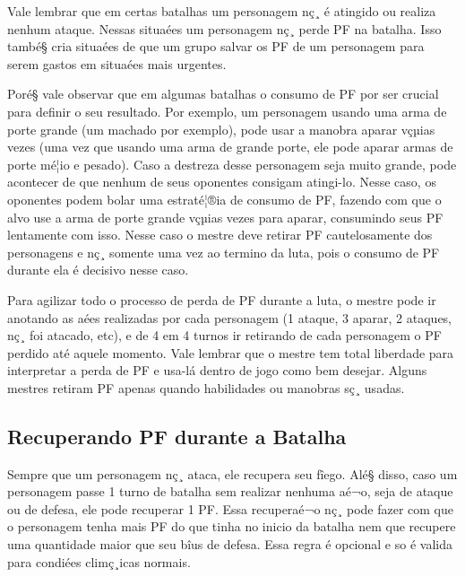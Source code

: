 Vale lembrar que em certas batalhas um personagem nç¸ é atingido ou realiza nenhum ataque. Nessas situaées um personagem nç¸ perde PF na batalha. Isso també§ cria situaées de que um grupo salvar os PF de um personagem para serem gastos em situaées mais urgentes. 

Poré§ vale observar que em algumas batalhas o consumo de PF por ser crucial para definir o seu resultado. Por exemplo, um personagem usando uma arma de porte grande (um machado por exemplo), pode usar a manobra aparar vçµias vezes (uma vez que usando uma arma de grande porte, ele pode aparar armas de porte mé¦io e pesado). Caso a destreza desse personagem seja muito grande, pode acontecer de que nenhum de seus oponentes consigam atingi-lo. Nesse caso, os oponentes podem bolar uma estraté¦®ia de consumo de PF, fazendo com que o alvo use a arma de porte grande vçµias vezes para aparar, consumindo seus PF lentamente com isso. Nesse caso o mestre deve retirar PF cautelosamente dos personagens e nç¸ somente uma vez ao termino da luta, pois o consumo de PF durante ela é decisivo nesse caso.

Para agilizar todo o processo de perda de PF durante a luta, o mestre pode ir anotando as aées realizadas por cada personagem (1 ataque, 3 aparar, 2 ataques, nç¸ foi atacado, etc), e de 4 em 4 turnos ir retirando de cada personagem o PF perdido até aquele momento. Vale lembrar que o mestre tem total liberdade para interpretar a perda de PF e usa-lá dentro de jogo como bem desejar. Alguns mestres retiram PF apenas quando habilidades ou manobras sç¸ usadas.


\subsection{Recuperando PF durante a Batalha}

Sempre que um personagem nç¸ ataca, ele recupera seu fîego. Alé§ disso, caso um personagem passe 1 turno de batalha sem realizar nenhuma aé¬o, seja de ataque ou de defesa, ele pode recuperar 1 PF. Essa recuperaé¬o nç¸ pode fazer com que o personagem tenha mais PF do que tinha no inicio da batalha nem que recupere uma quantidade maior que seu bîus de defesa. Essa regra é opcional e so é valida para condiées climç¸icas normais.

